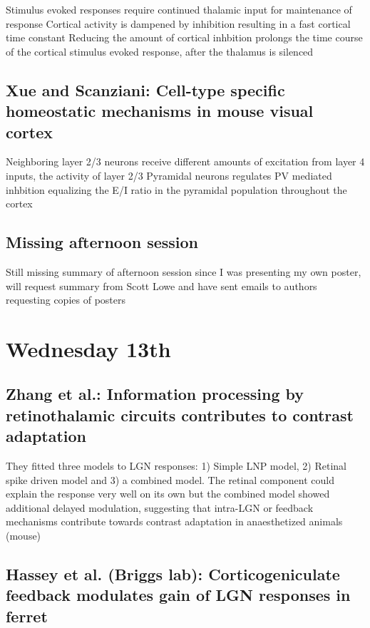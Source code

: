 \documentclass[11pt]{Science}
\begin{document}
Stimulus evoked responses require continued thalamic input for maintenance of response
Cortical activity is dampened by inhibition resulting in a fast cortical time constant
Reducing the amount of cortical inhbition prolongs the time course of the cortical stimulus evoked response, after the thalamus is silenced

\subsection{Xue and Scanziani: Cell-type specific homeostatic mechanisms in mouse visual cortex}
\label{sec-3.4}


Neighboring layer 2/3 neurons receive different amounts of excitation from layer 4 inputs, the activity of layer 2/3 Pyramidal neurons regulates PV mediated inhbition equalizing the E/I ratio in the pyramidal population throughout the cortex

\subsection{Missing afternoon session}
\label{sec-3.5}

Still missing summary of afternoon session since I was presenting my own poster, will request summary from Scott Lowe and have sent emails to authors requesting copies of posters


\section{Wednesday 13th}
\label{sec-4}


\subsection{Zhang et al.: Information processing by retinothalamic circuits contributes to contrast adaptation}
\label{sec-4.1}


They fitted three models to LGN responses:  1) Simple LNP model, 2) Retinal spike driven model and 3) a combined model. The retinal component could explain the response very well on its own but the combined model showed additional delayed modulation, suggesting that intra-LGN or feedback mechanisms contribute towards contrast adaptation in anaesthetized animals (mouse)

\subsection{Hassey et al. (Briggs lab): Corticogeniculate feedback modulates gain of LGN responses in ferret}
\label{sec-4.2}
\end{document}
